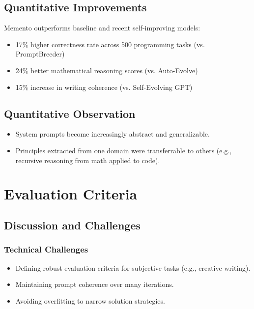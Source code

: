 \documentclass[10pt,a4paper,twocolumn]{article}
\begin{document}
\subsection{Quantitative Improvements}


 Memento outperforms baseline and recent self-improving models:

\begin{itemize}
    \item 17\% higher correctness rate across 500 programming tasks (vs. PromptBreeder)
    \item 24\% better mathematical reasoning scores (vs. Auto-Evolve)
    \item 15\% increase in writing coherence (vs. Self-Evolving GPT)
\end{itemize}



\subsection{Quantitative Observation}


\begin{itemize}
    \item System prompts become increasingly abstract and generalizable.
    \item Principles extracted from one domain were transferrable to others (e.g., recursive reasoning from math applied to code).
\end{itemize}







\section{Evaluation Criteria} 


\subsection{Discussion and Challenges}




\subsubsection{Technical Challenges}



\begin{itemize}
    \item Defining robust evaluation criteria for subjective tasks (e.g., creative writing).
    \item Maintaining prompt coherence over many iterations.
    \item Avoiding overfitting to narrow solution strategies.
\end{itemize}
\end{document}
